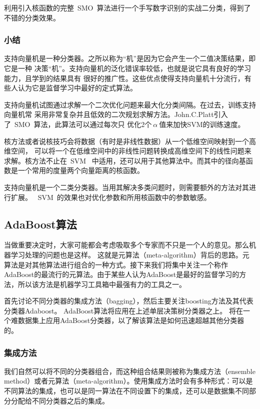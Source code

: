 利用引入核函数的完整~SMO~算法进行一个手写数字识别的实战二分类，得到了不错的分类效果。


\subsubsection{小结}
支持向量机是一种分类器。之所以称为“机”是因为它会产生一个二值决策结果，即它是一种
决策“机”。支持向量机的泛化错误率较低，也就是说它具有良好的学习能力，且学到的结果具有
很好的推广性。这些优点使得支持向量机十分流行，有些人认为它是监督学习中最好的定式算法。

支持向量机试图通过求解一个二次优化问题来最大化分类间隔。在过去，训练支持向量机常
采用非常复杂并且低效的二次规划求解方法。John.C.Platt引入了~SMO~算法，此算法可以通过每次只
优化2个$~\alpha~$值来加快SVM的训练速度。

核方法或者说核技巧会将数据（有时是非线性数据）从一个低维空间映射到一个高维空间，
可以将一个在低维空间中的非线性问题转换成高维空间下的线性问题来求解。核方法不止在~SVM~
中适用，还可以用于其他算法中。而其中的径向基函数是一个常用的度量两个向量距离的核函数。

支持向量机是一个二类分类器。当用其解决多类问题时，则需要额外的方法对其进行扩展。
~SVM~的效果也对优化参数和所用核函数中的参数敏感。

\newpage
\subsection{AdaBoost算法}
当做重要决定时，大家可能都会考虑吸取多个专家而不只是一个人的意见。那么机器学习处理的问题也是这样。
这就是元算法（meta-algorithm）背后的思路。元算法是对其他算法进行组合的一种方式。接下来我们将集中关注一个称作AdaBoost的最流行的元算法。由于某些人认为AdaBoost是最好的监督学习的方法，所以该方法是机器学习工具箱中最强有力的工具之一。

首先讨论不同分类器的集成方法（bagging），然后主要关注boosting方法及其代表分类器Adaboost。
AdaBoost算法将应用在上述单层决策树分类器之上。
将在一个难数据集上应用AdaBoost分类器，以了解该算法是如何迅速超越其他分类器的。

\subsubsection{集成方法}
我们自然可以将不同的分类器组合，而这种组合结果则被称为集成方法（ensemble method）或者元算法（meta-algorithm）。使用集成方法时会有多种形式：可以是不同算法的集成，也可以是同一算法在不同设置下的集成，还可以是数据集不同部分分配给不同分类器之后的集成。


